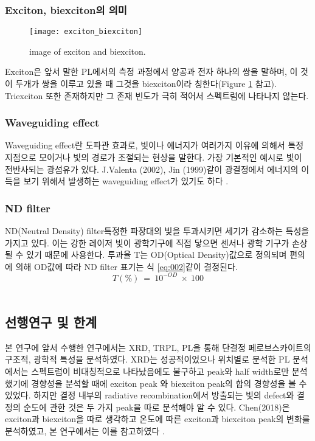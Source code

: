 \subsubsection{Exciton, biexciton의 의미}
\begin{figure}[H]
	\begin{center}
			\texttt{[image: exciton\_biexciton]}
	\end{center}
	\caption{image of exciton and biexciton.}
	\label{fig:ex}  
\end{figure}
Exciton은 앞서 말한 PL에서의 측정 과정에서 양공과 전자 하나의 쌍을 말하며, 이 것이 두개가 쌍을 이루고 있을 때 그것을 biexciton이라 칭한다(Figure \ref{fig:ex} 참고). Triexciton 또한 존재하지만 그 존재 빈도가 극히 적어서 스펙트럼에 나타나지 않는다. 
\\
\subsubsection{Waveguiding effect}
Waveguiding effect란 도파관 효과로, 빛이나 에너지가 여러가지 이유에 의해서 특정 지점으로 모이거나 빛의 경로가 조절되는 현상을 말한다. 가장 기본적인 예시로 빛이 전반사되는 광섬유가 있다. J.Valenta (2002), Jin (1999)\와 같이 광결정에서 에너지의 이득을 보기 위해서 발생하는 waveguiding effect가 있기도 하다\cite{valenta2002waveguiding} \cite{jin1999band}. 


\subsubsection{ND filter}
ND(Neutral Density) filter\는 특정한 파장대의 빛을 투과시키면 세기가 감소하는 특성을 가지고 있다. 이는 강한 레이저 빛이 광학기구에 직접 닿으면 센서나 광학 기구가 손상될 수 있기 때문에 사용한다. 투과율 T는 OD(Optical Density)값으로 정의되며 편의에 의해 OD값에 따라 ND filter 표기는 식 \ref{eq:002}\와 같이 결정된다.
\begin{equation}
T(\%)~=~10^{-OD}~\times~100
\label{eq:002}
\end{equation}
\\

\subsection{선행연구 및 한계}
본 연구에 앞서 수행한 연구에서는 XRD, TRPL, PL을 통해 단결정 페로브스카이트의 구조적, 광학적 특성을 분석하였다. XRD는 성공적이었으나 위치별로 분석한 PL 분석에서는 스펙트럼이 비대칭적으로 나타났음에도 불구하고 peak와 half width로만 분석했기에 경향성을 분석할 때에 exciton peak 와 biexciton peak의 합의 경향성을 볼 수 있었다. 하지만 결정 내부의 radiative recombination에서 방출되는 빛의 defect와 결정의 순도에 관한 것은 두 가지 peak을 따로 분석해야 알 수 있다. Chen(2018)은 exciton과 biexciton을 따로 생각하고 온도에 따른 exciton과 biexciton peak의 변화를 분석하였고, 본 연구에서는 이를 참고하였다 \cite{chen2018room}. 
\\

